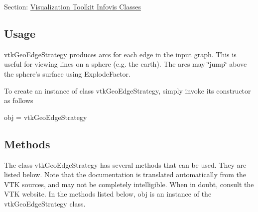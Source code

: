 Section\-: \hyperlink{sec_vtkinfovis}{Visualization Toolkit Infovis Classes} \hypertarget{vtkwidgets_vtkxyplotwidget_Usage}{}\subsection{Usage}\label{vtkwidgets_vtkxyplotwidget_Usage}
vtk\-Geo\-Edge\-Strategy produces arcs for each edge in the input graph. This is useful for viewing lines on a sphere (e.\-g. the earth). The arcs may \char`\"{}jump\char`\"{} above the sphere's surface using Explode\-Factor.

To create an instance of class vtk\-Geo\-Edge\-Strategy, simply invoke its constructor as follows \begin{DoxyVerb}  obj = vtkGeoEdgeStrategy
\end{DoxyVerb}
 \hypertarget{vtkwidgets_vtkxyplotwidget_Methods}{}\subsection{Methods}\label{vtkwidgets_vtkxyplotwidget_Methods}
The class vtk\-Geo\-Edge\-Strategy has several methods that can be used. They are listed below. Note that the documentation is translated automatically from the V\-T\-K sources, and may not be completely intelligible. When in doubt, consult the V\-T\-K website. In the methods listed below, {\ttfamily obj} is an instance of the vtk\-Geo\-Edge\-Strategy class. 
